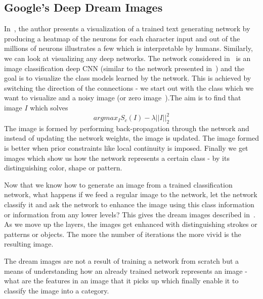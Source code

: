 \documentclass[10pt]{article}
\begin{document}
\subsection{Google's Deep Dream Images}
\par In~\cite{karpathy2016unreasonable}, the author presents a visualization of a trained text generating network by producing a heatmap of the neurons for each character input and out of the millions of neurons illustrates a few which is interpretable by humans. Similarly, we can look at visualizing any deep networks. The network considered in~\cite{tyka2015inceptionism} is an image classification deep CNN (similar to the network presented in~\cite{krizhevsky2012imagenet}) and the goal is to visualize the class models learned by the network. This is achieved by switching the direction of the connections - we start out with the class which we want to visualize and a noisy image (or zero image~\cite{simonyan2013deep}).The aim is to find that image $I$ which solves
\begin{equation}
argmax_{I} S_{c}(I) - \lambda \vert\vert I \vert\vert_{2}^{2}
\end{equation}
The image is formed by performing back-propagation through the network and instead of updating the network weights, the image is updated. The image formed is better when prior constraints like local continuity is imposed. Finally we get images which show us how the network represents a certain class - by its distinguishing color, shape or pattern. 
\par Now that we know how to generate an image from a trained classification network, what happens if we feed a regular image to the network, let the network classify it and ask the network to enhance the image using this class information or information from any lower levels? This gives the dream images described in~\cite{titcomb2016google}. As we move up the layers, the images get enhanced with distinguishing strokes or patterns or objects. The more the number of iterations the more vivid is the resulting image. 
\par The dream images are not a result of training a network from scratch but a means of understanding how an already trained network represents an image - what are the features in an image that it picks up which finally enable it to classify the image into a category. 
\end{document}
